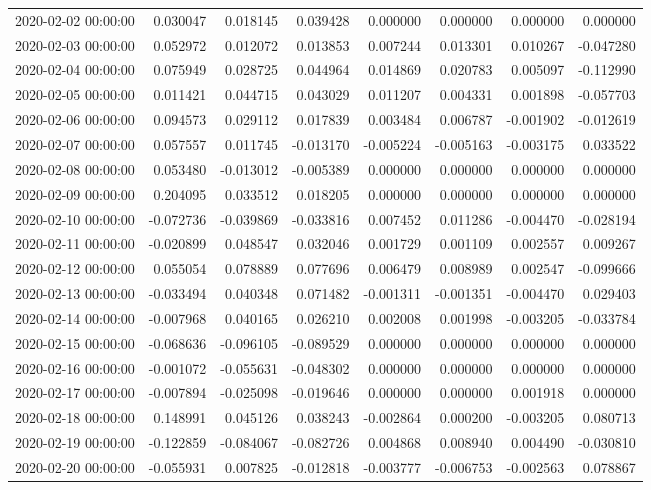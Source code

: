\begin{tabular}{lrrrrrrr}
2020-02-02 00:00:00 & 0.030047 & 0.018145 & 0.039428 & 0.000000 & 0.000000 & 0.000000 & 0.000000 \\
2020-02-03 00:00:00 & 0.052972 & 0.012072 & 0.013853 & 0.007244 & 0.013301 & 0.010267 & -0.047280 \\
2020-02-04 00:00:00 & 0.075949 & 0.028725 & 0.044964 & 0.014869 & 0.020783 & 0.005097 & -0.112990 \\
2020-02-05 00:00:00 & 0.011421 & 0.044715 & 0.043029 & 0.011207 & 0.004331 & 0.001898 & -0.057703 \\
2020-02-06 00:00:00 & 0.094573 & 0.029112 & 0.017839 & 0.003484 & 0.006787 & -0.001902 & -0.012619 \\
2020-02-07 00:00:00 & 0.057557 & 0.011745 & -0.013170 & -0.005224 & -0.005163 & -0.003175 & 0.033522 \\
2020-02-08 00:00:00 & 0.053480 & -0.013012 & -0.005389 & 0.000000 & 0.000000 & 0.000000 & 0.000000 \\
2020-02-09 00:00:00 & 0.204095 & 0.033512 & 0.018205 & 0.000000 & 0.000000 & 0.000000 & 0.000000 \\
2020-02-10 00:00:00 & -0.072736 & -0.039869 & -0.033816 & 0.007452 & 0.011286 & -0.004470 & -0.028194 \\
2020-02-11 00:00:00 & -0.020899 & 0.048547 & 0.032046 & 0.001729 & 0.001109 & 0.002557 & 0.009267 \\
2020-02-12 00:00:00 & 0.055054 & 0.078889 & 0.077696 & 0.006479 & 0.008989 & 0.002547 & -0.099666 \\
2020-02-13 00:00:00 & -0.033494 & 0.040348 & 0.071482 & -0.001311 & -0.001351 & -0.004470 & 0.029403 \\
2020-02-14 00:00:00 & -0.007968 & 0.040165 & 0.026210 & 0.002008 & 0.001998 & -0.003205 & -0.033784 \\
2020-02-15 00:00:00 & -0.068636 & -0.096105 & -0.089529 & 0.000000 & 0.000000 & 0.000000 & 0.000000 \\
2020-02-16 00:00:00 & -0.001072 & -0.055631 & -0.048302 & 0.000000 & 0.000000 & 0.000000 & 0.000000 \\
2020-02-17 00:00:00 & -0.007894 & -0.025098 & -0.019646 & 0.000000 & 0.000000 & 0.001918 & 0.000000 \\
2020-02-18 00:00:00 & 0.148991 & 0.045126 & 0.038243 & -0.002864 & 0.000200 & -0.003205 & 0.080713 \\
2020-02-19 00:00:00 & -0.122859 & -0.084067 & -0.082726 & 0.004868 & 0.008940 & 0.004490 & -0.030810 \\
2020-02-20 00:00:00 & -0.055931 & 0.007825 & -0.012818 & -0.003777 & -0.006753 & -0.002563 & 0.078867 \\

\end{tabular}
